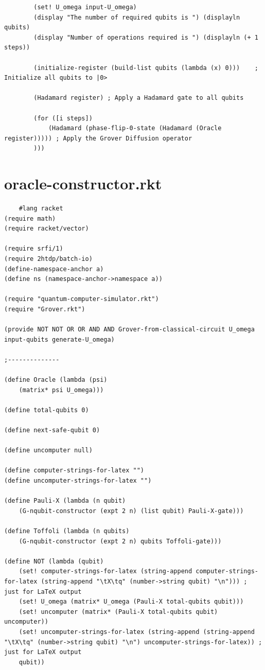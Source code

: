 \documentclass[11pt]{report}
\newcommand{\?}{\stackrel{?}{=}}
\begin{document}
\begin{appendix}
\begin{lstlisting}
		(set! U_omega input-U_omega)
		(display "The number of required qubits is ") (displayln qubits)
		(display "Number of operations required is ") (displayln (+ 1 steps))

		(initialize-register (build-list qubits (lambda (x) 0)))	; Initialize all qubits to |0>

		(Hadamard register)	; Apply a Hadamard gate to all qubits

		(for ([i steps])
			(Hadamard (phase-flip-0-state (Hadamard (Oracle register))))) ; Apply the Grover Diffusion operator
		)))
	\end{lstlisting}
	\chapter{oracle-constructor.rkt}
	\begin{lstlisting}
	#lang racket
(require math)
(require racket/vector)

(require srfi/1)
(require 2htdp/batch-io)
(define-namespace-anchor a)
(define ns (namespace-anchor->namespace a))

(require "quantum-computer-simulator.rkt")
(require "Grover.rkt")

(provide NOT NOT OR OR AND AND Grover-from-classical-circuit U_omega input-qubits generate-U_omega)

;--------------

(define Oracle (lambda (psi)
	(matrix* psi U_omega)))

(define total-qubits 0)

(define next-safe-qubit 0)

(define uncomputer null)

(define computer-strings-for-latex "")
(define uncomputer-strings-for-latex "")

(define Pauli-X (lambda (n qubit)
	(G-nqubit-constructor (expt 2 n) (list qubit) Pauli-X-gate)))

(define Toffoli (lambda (n qubits)
	(G-nqubit-constructor (expt 2 n) qubits Toffoli-gate)))

(define NOT (lambda (qubit)
	(set! computer-strings-for-latex (string-append computer-strings-for-latex (string-append "\tX\tq" (number->string qubit) "\n"))) ; just for LaTeX output
	(set! U_omega (matrix* U_omega (Pauli-X total-qubits qubit)))
	(set! uncomputer (matrix* (Pauli-X total-qubits qubit) uncomputer))
	(set! uncomputer-strings-for-latex (string-append (string-append "\tX\tq" (number->string qubit) "\n") uncomputer-strings-for-latex)) ; just for LaTeX output
	qubit))


\end{lstlisting}
\end{appendix}
\end{document}
